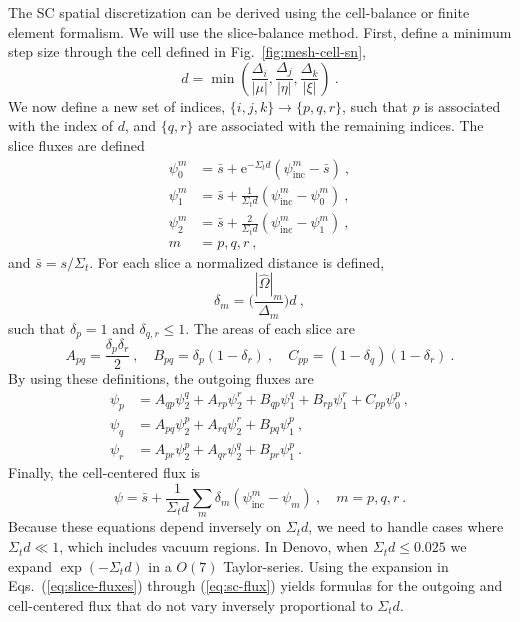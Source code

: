 \documentclass[12pt]{article}
\newcommand{\vOmega}{\ensuremath{\hat{\Omega}}}
\newcommand{\Di}{\ensuremath{\Delta_i}}
\newcommand{\Dj}{\ensuremath{\Delta_j}}
\newcommand{\Dk}{\ensuremath{\Delta_k}}
\begin{document}
The SC spatial discretization can be derived using the cell-balance or finite
element formalism.  We will use the slice-balance method.%
First, define a minimum step size through the
cell defined in Fig.~\ref{fig:mesh-cell-sn},
\begin{equation}
  d = \min\left(\frac{\Di}{|\mu|}, \frac{\Dj}{|\eta|},
    \frac{\Dk}{|\xi|}\right)\:.
\end{equation}
We now define a new set of indices, $\{i,j,k\}\rightarrow\{p,q,r\}$, such that
$p$ is associated with the index of $d$,
and $\{q,r\}$ are associated with the remaining indices.  The slice fluxes are
defined
\begin{equation}
  \begin{aligned}
    \psi^m_0 &= \bar{s} + \text{e}^{-\Sigma_t d}(\psi^m_{\text{inc}} -
    \bar{s})\:,\\ \psi^m_1 &= \bar{s} + \frac{1}{\Sigma_t d}(\psi^m_{\text{inc}}
    - \psi^m_0)\:,\\ \psi^m_2 &= \bar{s} + \frac{2}{\Sigma_t
      d}(\psi^m_{\text{inc}} - \psi^m_1)\:,\\ m &= p,q,r\:,
  \end{aligned}
  \label{eq:slice-fluxes}
\end{equation}
and $\bar{s} = s/\Sigma_t$.  For each slice a normalized distance is defined,
\begin{equation}
  \delta_m = \biggl(\frac{|\vOmega|_m}{\Delta_m}\biggr)d\:,
\end{equation}
such that $\delta_p = 1$ and $\delta_{q,r}\le 1$.  The areas of each slice are
\begin{equation}
  A_{pq} = \frac{\delta_p\delta_r}{2}\:,\quad B_{pq} =
  \delta_p(1-\delta_r)\:,\quad C_{pp} = (1-\delta_q)(1-\delta_r)\:.
\end{equation}
By using these definitions, the outgoing fluxes are
\begin{equation}
  \begin{aligned}
    \psi_p &= A_{qp}\psi_2^q + A_{rp}\psi_2^r + B_{qp}\psi_1^q +
    B_{rp}\psi_1^r + C_{pp}\psi_0^p\:,\\
    \psi_q &= A_{pq}\psi_2^p + A_{rq}\psi_2^r + B_{pq}\psi_1^p\:,\\
    \psi_r &= A_{pr}\psi_2^p + A_{qr}\psi_2^q + B_{pr}\psi_1^p\:.
  \end{aligned}
\end{equation}
Finally, the cell-centered flux is
\begin{equation}
  \psi = \bar{s} + \frac{1}{\Sigma_t
    d}\sum_{m}\delta_m(\psi_\text{inc}^m - \psi_m)\:,\quad m=p,q,r\:.
  \label{eq:sc-flux}
\end{equation}
Because these equations depend inversely on $\Sigma_t d$, we need to handle
cases where $\Sigma_t d \ll 1$, which includes vacuum regions.  In Denovo,
when $\Sigma_t d \le 0.025$ we expand $\exp(-\Sigma_t d)$ in a $O(7)$
Taylor-series.  Using the expansion in Eqs.~(\ref{eq:slice-fluxes}) through
(\ref{eq:sc-flux}) yields formulas for the outgoing and cell-centered flux
that do not vary inversely proportional to $\Sigma_t d$.
\end{document}
